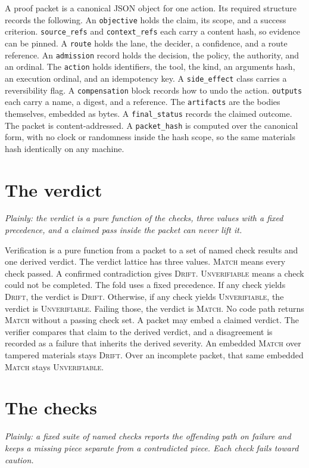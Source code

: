 \documentclass[11pt]{article}
\begin{document}
A proof packet is a canonical JSON object for one action. Its required structure records the following. An \texttt{objective} holds the claim, its scope, and a success criterion. \texttt{source\_refs} and \texttt{context\_refs} each carry a content hash, so evidence can be pinned. A \texttt{route} holds the lane, the decider, a confidence, and a route reference. An \texttt{admission} record holds the decision, the policy, the authority, and an ordinal. The \texttt{action} holds identifiers, the tool, the kind, an arguments hash, an execution ordinal, and an idempotency key. A \texttt{side\_effect} class carries a reversibility flag. A \texttt{compensation} block records how to undo the action. \texttt{outputs} each carry a name, a digest, and a reference. The \texttt{artifacts} are the bodies themselves, embedded as bytes. A \texttt{final\_status} records the claimed outcome. The packet is content-addressed. A \texttt{packet\_hash} is computed over the canonical form, with no clock or randomness inside the hash scope, so the same materials hash identically on any machine.

\section{The verdict}\label{sec:verdict}
\emph{Plainly: the verdict is a pure function of the checks, three values with a fixed precedence, and a claimed pass inside the packet can never lift it.}

Verification is a pure function from a packet to a set of named check results and one derived verdict. The verdict lattice has three values. \textsc{Match} means every check passed. A confirmed contradiction gives \textsc{Drift}. \textsc{Unverifiable} means a check could not be completed. The fold uses a fixed precedence. If any check yields \textsc{Drift}, the verdict is \textsc{Drift}. Otherwise, if any check yields \textsc{Unverifiable}, the verdict is \textsc{Unverifiable}. Failing those, the verdict is \textsc{Match}. No code path returns \textsc{Match} without a passing check set. A packet may embed a claimed verdict. The verifier compares that claim to the derived verdict, and a disagreement is recorded as a failure that inherits the derived severity. An embedded \textsc{Match} over tampered materials stays \textsc{Drift}. Over an incomplete packet, that same embedded \textsc{Match} stays \textsc{Unverifiable}.

\section{The checks}\label{sec:checks}
\emph{Plainly: a fixed suite of named checks reports the offending path on failure and keeps a missing piece separate from a contradicted piece. Each check fails toward caution.}
\end{document}
